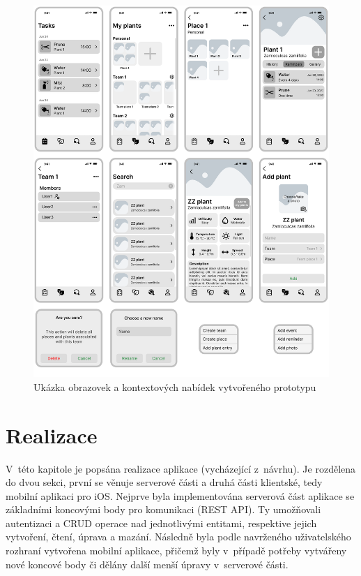 \documentclass[thesis=M,czech]{FITthesis}[2019/12/23]
\begin{document}
\begin{figure}
	\centering
	\includegraphics[width=1\linewidth]{images/wireframes.png}
  	\caption{Ukázka obrazovek a kontextových nabídek vytvořeného prototypu}
  	\label{img:prototype-showcase}
\end{figure}


\chapter{Realizace}
\label{ch4}
V~této kapitole je popsána realizace aplikace (vycházející z~návrhu). Je rozdělena do dvou sekci, první se věnuje serverové části a druhá části klientské, tedy mobilní aplikaci pro iOS. Nejprve byla implementována serverová část aplikace se základními koncovými body pro komunikaci (REST API). Ty umožňovali autentizaci a CRUD operace nad jednotlivými entitami, respektive jejich vytvoření, čtení, úprava a mazání. Následně byla podle navrženého uživatelského rozhraní vytvořena mobilní aplikace, přičemž byly v~případě potřeby vytvářeny nové koncové body či dělány další menší úpravy v~serverové části.
\end{document}
